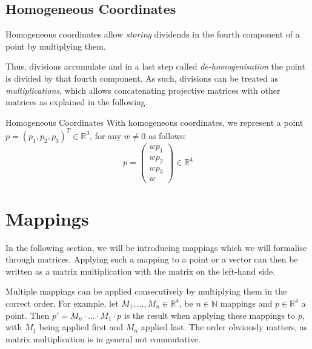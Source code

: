 \documentclass{panikzettel}
\begin{document}
\subsection{Homogeneous Coordinates}
\begin{halfboxl}
Homogeneous coordinates allow \emph{storing} dividends in the fourth component of a point by multiplying them.

Thus, divisions accumulate and in a last step called \emph{de-homogenisation} the point is divided by that fourth component. As such, divisions can be treated as \emph{multiplications}, which allows concatenating projective matrices with other matrices as explained in the following.
\end{halfboxl}%
\begin{halfboxr}
\vspace{-\baselineskip}
\begin{defi}{Homogeneous Coordinates}
With homogeneous coordinates, we represent a point $p = (p_1, p_2, p_3)^T \in \mathbb{R}^3$, for any $w \neq 0$ as follows:
$$p = \begin{pmatrix} wp_1 \\ wp_2 \\ wp_3 \\ w \end{pmatrix} \in \mathbb{R}^4$$
\end{defi}
\end{halfboxr}
\section{Mappings}

In the following section, we will be introducing mappings which we will formalise through matrices. Applying such a mapping to a point or a vector can then be written as a matrix multiplication with the matrix on the left-hand side.

Multiple mappings can be applied consecutively by multiplying them in the correct order. For example, let $M_1, \ldots , M_n \in \mathbb{R}^4$, be $n \in \mathbb{N}$ mappings and $p \in \mathbb{R}^4$ a point. Then $p'= M_n \cdot \ldots \cdot M_1 \cdot p$ is the result when applying these mappings to $p$, with $M_1$ being applied first and $M_n$ applied last. The order obviously matters, as matrix multiplication is in general not commutative.
\end{document}
